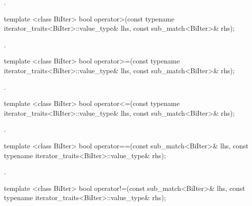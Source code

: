 \begin{itemdescr}
\pnum
\returns {}.
\end{itemdescr}

%
\begin{itemdecl}
template <class BiIter>
  bool operator>(const typename iterator_traits<BiIter>::value_type& lhs,
                 const sub_match<BiIter>& rhs);
\end{itemdecl}

\begin{itemdescr}
\pnum
\returns {}.
\end{itemdescr}

%
\begin{itemdecl}
template <class BiIter>
  bool operator>=(const typename iterator_traits<BiIter>::value_type& lhs,
                  const sub_match<BiIter>& rhs);
\end{itemdecl}

\begin{itemdescr}
\pnum
\returns {}.
\end{itemdescr}

%
\begin{itemdecl}
template <class BiIter>
  bool operator<=(const typename iterator_traits<BiIter>::value_type& lhs,
                  const sub_match<BiIter>& rhs);
\end{itemdecl}

\begin{itemdescr}
\pnum
\returns {}.
\end{itemdescr}

%
\begin{itemdecl}
template <class BiIter>
  bool operator==(const sub_match<BiIter>& lhs,
                  const typename iterator_traits<BiIter>::value_type& rhs);
\end{itemdecl}

\begin{itemdescr}
\pnum
\returns {}.
\end{itemdescr}

%
\begin{itemdecl}
template <class BiIter>
  bool operator!=(const sub_match<BiIter>& lhs,
                  const typename iterator_traits<BiIter>::value_type& rhs);
\end{itemdecl}

